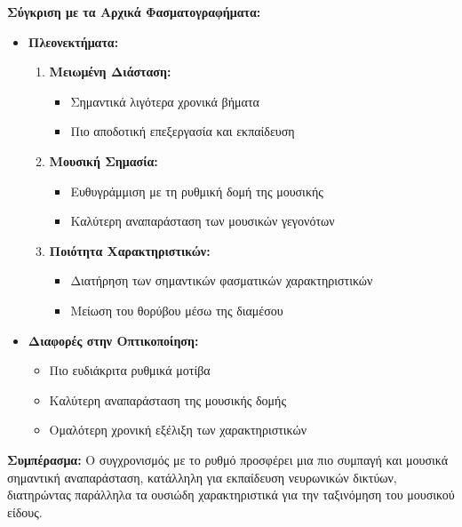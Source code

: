 \documentclass[a4paper,12pt]{article}
\begin{document}
\textbf{Σύγκριση με τα Αρχικά Φασματογραφήματα:}
\begin{itemize}
    \item \textbf{Πλεονεκτήματα:}
          \begin{enumerate}
              \item \textbf{Μειωμένη Διάσταση:}
                    \begin{itemize}
                        \item Σημαντικά λιγότερα χρονικά βήματα
                        \item Πιο αποδοτική επεξεργασία και εκπαίδευση
                    \end{itemize}

              \item \textbf{Μουσική Σημασία:}
                    \begin{itemize}
                        \item Ευθυγράμμιση με τη ρυθμική δομή της μουσικής
                        \item Καλύτερη αναπαράσταση των μουσικών γεγονότων
                    \end{itemize}

              \item \textbf{Ποιότητα Χαρακτηριστικών:}
                    \begin{itemize}
                        \item Διατήρηση των σημαντικών φασματικών χαρακτηριστικών
                        \item Μείωση του θορύβου μέσω της διαμέσου
                    \end{itemize}
          \end{enumerate}

    \item \textbf{Διαφορές στην Οπτικοποίηση:}
          \begin{itemize}
              \item Πιο ευδιάκριτα ρυθμικά μοτίβα
              \item Καλύτερη αναπαράσταση της μουσικής δομής
              \item Ομαλότερη χρονική εξέλιξη των χαρακτηριστικών
          \end{itemize}
\end{itemize}

\textbf{Συμπέρασμα:}
Ο συγχρονισμός με το ρυθμό προσφέρει μια πιο συμπαγή και μουσικά σημαντική αναπαράσταση, κατάλληλη για εκπαίδευση νευρωνικών δικτύων, διατηρώντας παράλληλα τα ουσιώδη χαρακτηριστικά για την ταξινόμηση του μουσικού είδους.
\end{document}
